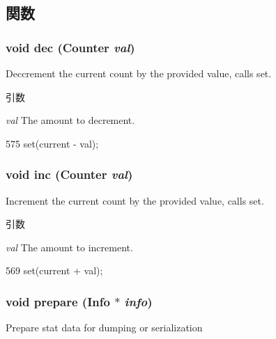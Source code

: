 \subsection{関数}
\hypertarget{classStats_1_1AvgStor_a89d7b0cf8f0932a96f6728d61d5818b1}{
\subsubsection[{dec}]{\setlength{\rightskip}{0pt plus 5cm}void dec ({\bf Counter} {\em val})}}
\label{classStats_1_1AvgStor_a89d7b0cf8f0932a96f6728d61d5818b1}
Deccrement the current count by the provided value, calls set. 
\begin{DoxyParams}{引数}
\item[{\em val}]The amount to decrement. \end{DoxyParams}



\begin{DoxyCode}
575 { set(current - val); }
\end{DoxyCode}
\hypertarget{classStats_1_1AvgStor_a8e52de5dde7b3cab8328c91dbbb1f229}{
\subsubsection[{inc}]{\setlength{\rightskip}{0pt plus 5cm}void inc ({\bf Counter} {\em val})}}
\label{classStats_1_1AvgStor_a8e52de5dde7b3cab8328c91dbbb1f229}
Increment the current count by the provided value, calls set. 
\begin{DoxyParams}{引数}
\item[{\em val}]The amount to increment. \end{DoxyParams}



\begin{DoxyCode}
569 { set(current + val); }
\end{DoxyCode}
\hypertarget{classStats_1_1AvgStor_a496667796a30696e960f80f4e3d69e69}{
\subsubsection[{prepare}]{\setlength{\rightskip}{0pt plus 5cm}void prepare ({\bf Info} $\ast$ {\em info})}}
\label{classStats_1_1AvgStor_a496667796a30696e960f80f4e3d69e69}
Prepare stat data for dumping or serialization 


